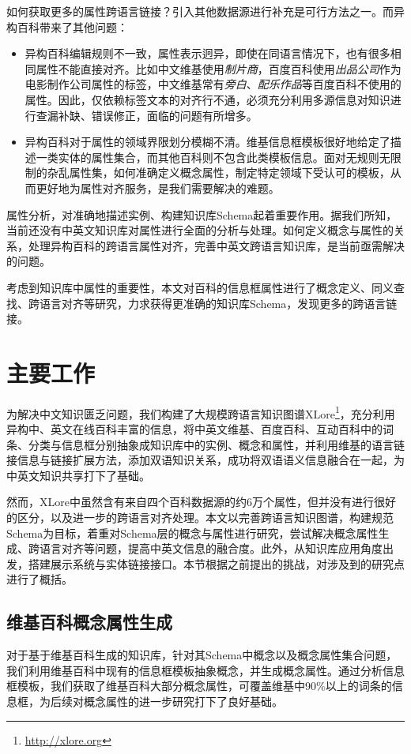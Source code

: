 如何获取更多的属性跨语言链接？引入其他数据源进行补充是可行方法之一。而异构百科带来了其他问题：
\begin{itemize}
\item {\heiti 异构百科编辑规则不一致}，属性表示迥异，即使在同语言情况下，也有很多相同属性不能直接对齐。比如中文维基使用\textit{制片商}，百度百科使用\textit{出品公司}作为电影制作公司属性的标签，中文维基常有\textit{旁白}、\textit{配乐作品}等百度百科不使用的属性。因此，仅依赖标签文本的对齐行不通，必须充分利用多源信息对知识进行查漏补缺、错误修正，面临的问题有所增多。
\item {\heiti 异构百科对于属性的领域界限划分模糊不清}。维基信息框模板很好地给定了描述一类实体的属性集合，而其他百科则不包含此类模板信息。面对无规则无限制的杂乱属性集，如何准确定义概念属性，制定特定领域下受认可的模板，从而更好地为属性对齐服务，是我们需要解决的难题。
\end{itemize}

属性分析，对准确地描述实例、构建知识库Schema起着重要作用。据我们所知，当前还没有中英文知识库对属性进行全面的分析与处理。如何定义概念与属性的关系，处理异构百科的跨语言属性对齐，完善中英文跨语言知识库，是当前亟需解决的问题。

考虑到知识库中属性的重要性，本文对百科的信息框属性进行了概念定义、同义查找、跨语言对齐等研究，力求获得更准确的知识库Schema，发现更多的跨语言链接。

\section{主要工作}
为解决中文知识匮乏问题，我们构建了大规模跨语言知识图谱XLore\footnote{\url{http://xlore.org}}，充分利用异构中、英文在线百科丰富的信息，将中英文维基、百度百科、互动百科中的词条、分类与信息框分别抽象成知识库中的实例、概念和属性，并利用维基的语言链接信息与链接扩展方法\cite{wang2012cross}，添加双语知识关系，成功将双语语义信息融合在一起，为中英文知识共享打下了基础。

然而，XLore中虽然含有来自四个百科数据源的约6万个属性，但并没有进行很好的区分，以及进一步的跨语言对齐处理。本文以完善跨语言知识图谱，构建规范Schema为目标，着重对Schema层的概念与属性进行研究，尝试解决概念属性生成、跨语言对齐等问题，提高中英文信息的融合度。此外，从知识库应用角度出发，搭建展示系统与实体链接接口。本节根据之前提出的挑战，对涉及到的研究点进行了概括。

\subsection{维基百科概念属性生成}
对于基于维基百科生成的知识库，针对其Schema中概念以及概念属性集合问题，我们利用维基百科中现有的信息框模板抽象概念，并生成概念属性。通过分析信息框模板，我们获取了维基百科大部分概念属性，可覆盖维基中90\%以上的词条的信息框，为后续对概念属性的进一步研究打下了良好基础。

